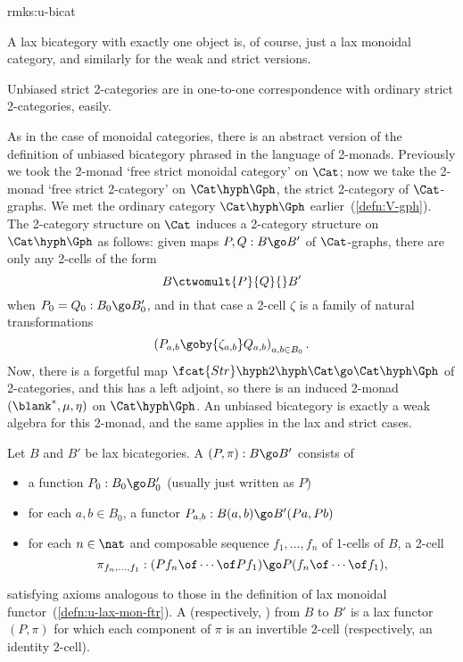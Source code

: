 \begin{remarks}{rmks:u-bicat}
\item A lax bicategory with exactly one object is, of course, just a lax
monoidal category, and similarly for the weak and strict versions.
 
\item Unbiased strict 2-categories are in one-to-one correspondence with
ordinary strict 2-categories, easily.
\end{remarks}

As in the case of monoidal categories, there is an abstract version of the
definition of unbiased bicategory phrased in the language of 2-monads.
Previously we took the 2-monad `free strict monoidal category' on $\Cat$;
now we take the 2-monad `free strict 2-category' on $\Cat\hyph\Gph$, the
strict 2-category of $\Cat$-graphs.%
%
%
 We met the ordinary category
$\Cat\hyph\Gph$ earlier~(\ref{defn:V-gph}).  The 2-category structure on
$\Cat$ induces a 2-category structure on $\Cat\hyph\Gph$ as follows: given
maps $P, Q: B \go B'$ of $\Cat$-graphs, there are only any 2-cells of the
form
\[
B \ctwomult{P}{Q}{} B'
\]
when $P_0 = Q_0: B_0 \go B'_0$, and in that case a 2-cell $\zeta$ is a
family of natural transformations
\[
\left(P_{a,b} \goby{\zeta_{a,b}} Q_{a,b} \right)_{a,b \in B_0}.
\]
Now, there is a forgetful map $\fcat{Str}\hyph 2\hyph\Cat \go
\Cat\hyph\Gph$ of 2-categories, and this has a left adjoint, so there is an
induced 2-monad $(\blank^*,\mu,\eta)$ on $\Cat\hyph\Gph$.  An unbiased
bicategory is exactly a weak algebra for this 2-monad, and the same applies
in the lax and strict cases.

\begin{defn}
Let $B$ and $B'$ be lax bicategories.  A %
%
%
%
%
%
$(P, \pi): B \go B'$ consists of
\begin{itemize}
\item
a function $P_0: B_0 \go B'_0$ (usually just written as $P$)
\item
for each $a,b\in B_0$, a functor $P_{a,b}: B(a,b) \go B'(Pa,Pb)$
\item
for each $n\in\nat$ and composable sequence $f_1, \ldots, f_n$ of 1-cells
of $B$, a 2-cell
\[
\pi_{f_n, \ldots, f_1}:
(Pf_n \of\cdots\of Pf_1)
\go
P(f_n \of\cdots\of f_1),
\]
\end{itemize}
%
satisfying axioms analogous to those in the definition of lax monoidal
functor~(\ref{defn:u-lax-mon-ftr}).  A  (respectively,
) from $B$ to $B'$ is a lax functor $(P, \pi)$ for
which each component of $\pi$ is an invertible 2-cell (respectively,
an identity 2-cell).
\end{defn}

